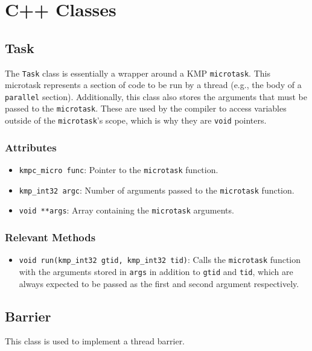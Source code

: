 \section{C++ Classes}
\label{sec:cpp-classes}

\subsection{Task}

The \texttt{Task} class is essentially a wrapper around a KMP \texttt{microtask}. This microtask
represents a section of code to be run by a thread (e.g., the body of a \texttt{parallel} section).
Additionally, this class also stores the arguments that must be passed to the \texttt{microtask}.
These are used by the compiler to access variables outside of the \texttt{microtask}'s scope, which
is why they are \texttt{void} pointers.

\subsubsection{Attributes}

\begin{itemize}
	\item \texttt{kmpc_micro func}: Pointer to the \texttt{microtask} function.
	\item \texttt{kmp_int32 argc}: Number of arguments passed to the \texttt{microtask} function.
	\item \texttt{void **args}: Array containing the \texttt{microtask} arguments.
\end{itemize}

\subsubsection{Relevant Methods}

\begin{itemize}
	\item \texttt{void run(kmp_int32 gtid, kmp_int32 tid)}: Calls the \texttt{microtask} function
	      with the arguments stored in \texttt{args} in addition to \texttt{gtid} and \texttt{tid},
	      which are always expected to be passed as the first and second argument respectively.
\end{itemize}

\subsection{Barrier}
This class is used to implement a thread barrier.

